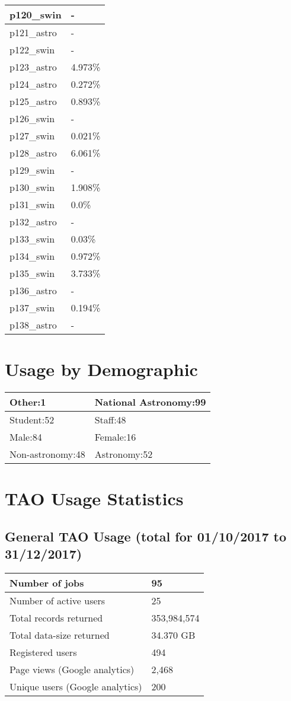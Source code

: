 \documentclass{article}%
\begin{document}
\begin{longtabu}{X[l] X[r]}
\hline%
p120\_swin&{-}\\%
\hline%
p121\_astro&{-}\\%
\hline%
p122\_swin&{-}\\%
\hline%
p123\_astro&4.973\%\\%
\hline%
p124\_astro&0.272\%\\%
\hline%
p125\_astro&0.893\%\\%
\hline%
p126\_swin&{-}\\%
\hline%
p127\_swin&0.021\%\\%
\hline%
p128\_astro&6.061\%\\%
\hline%
p129\_swin&{-}\\%
\hline%
p130\_swin&1.908\%\\%
\hline%
p131\_swin&0.0\%\\%
\hline%
p132\_astro&{-}\\%
\hline%
p133\_swin&0.03\%\\%
\hline%
p134\_swin&0.972\%\\%
\hline%
p135\_swin&3.733\%\\%
\hline%
p136\_astro&{-}\\%
\hline%
p137\_swin&0.194\%\\%
\hline%
p138\_astro&{-}\\%
\hline%
\end{longtabu}%
\section{Usage by Demographic}%

%
\begin{longtabu}{X[l] X[l]}%
Other:1&National Astronomy:99\\%
\hline%
Student:52&Staff:48\\%
\hline%
Male:84&Female:16\\%
\hline%
Non{-}astronomy:48&Astronomy:52\\%
\hline%
\end{longtabu}%
\newpage%
\section{TAO Usage Statistics}%

%
\subsection{General TAO Usage (total for 01/10/2017 to 31/12/2017)}%

%
\begin{longtabu}{X[l] X[l]}%
Number of jobs&95\\%
\hline%
Number of active users&25\\%
\hline%
Total records returned&353,984,574\\%
\hline%
Total data{-}size returned&34.370 GB\\%
\hline%
Registered users&494\\%
\hline%
Page views (Google analytics)&2,468\\%
\hline%
Unique users (Google analytics)&200\\%
\hline%
\end{longtabu}%
\end{document}
